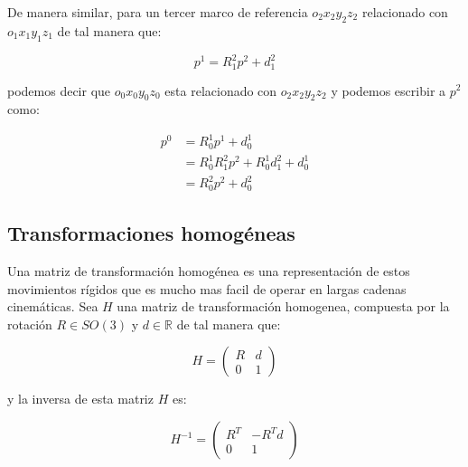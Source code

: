 \begin{multicols*}{3}
            De manera similar, para un tercer marco de referencia $o_2 x_2 y_2 z_2$ relacionado con $o_1 x_1 y_1 z_1$ de tal manera que:

            \begin{equation*}
                p^1 = R_1^2 p^2 + d_1^2
            \end{equation*}

            podemos decir que $o_0 x_0 y_0 z_0$ esta relacionado con $o_2 x_2 y_2 z_2$ y podemos escribir a $p^2$ como:

            \begin{align*}
                p^0 &= R_0^1 p^1 + d_0^1 \\
                &= R_0^1 R_1^2 p^2 + R_0^1 d_1^2 + d_0^1 \\
                &= R_0^2 p^2 + d_0^2
            \end{align*}


        \subsection{Transformaciones homogéneas}

            Una matriz de transformación homogénea es una representación de estos movimientos rígidos que es mucho mas facil de operar en largas cadenas cinemáticas. Sea $H$ una matriz de transformación homogenea, compuesta por la rotación $R \in SO(3)$ y $d \in \mathbb{R}$ de tal manera que:

            \begin{equation}
                H =
                \begin{pmatrix}
                    R & d \\
                    0 & 1
                \end{pmatrix}
            \end{equation}

            y la inversa de esta matriz $H$ es:

            \begin{equation}
                H^{-1} =
                \begin{pmatrix}
                    R^T & -R^T d \\
                    0 & 1
                \end{pmatrix}
            \end{equation}


\end{multicols*}
